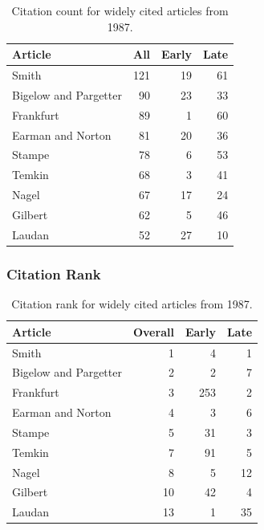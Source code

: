 \documentclass[
  10pt,
  letterpaper,
  DIV=11,
  numbers=noendperiod,
  twoside]{scrartcl}
\begin{document}
\begin{longtable}[]{@{}lrrr@{}}

\caption{\label{tbl-citation-count-1987}Citation count for widely cited
articles from 1987.}

\tabularnewline

\toprule\noalign{}
Article & All & Early & Late \\
\midrule\noalign{}
\endhead
\bottomrule\noalign{}
\endlastfoot
Smith & 121 & 19 & 61 \\
Bigelow and Pargetter & 90 & 23 & 33 \\
Frankfurt & 89 & 1 & 60 \\
Earman and Norton & 81 & 20 & 36 \\
Stampe & 78 & 6 & 53 \\
Temkin & 68 & 3 & 41 \\
Nagel & 67 & 17 & 24 \\
Gilbert & 62 & 5 & 46 \\
Laudan & 52 & 27 & 10 \\

\end{longtable}

\subsubsection*{Citation Rank}\label{sec-rank-1987}

\begin{longtable}[]{@{}lrrr@{}}

\caption{\label{tbl-citation-rank-1987}Citation rank for widely cited
articles from 1987.}

\tabularnewline

\toprule\noalign{}
Article & Overall & Early & Late \\
\midrule\noalign{}
\endhead
\bottomrule\noalign{}
\endlastfoot
Smith & 1 & 4 & 1 \\
Bigelow and Pargetter & 2 & 2 & 7 \\
Frankfurt & 3 & 253 & 2 \\
Earman and Norton & 4 & 3 & 6 \\
Stampe & 5 & 31 & 3 \\
Temkin & 7 & 91 & 5 \\
Nagel & 8 & 5 & 12 \\
Gilbert & 10 & 42 & 4 \\
Laudan & 13 & 1 & 35 \\

\end{longtable}
\end{document}
